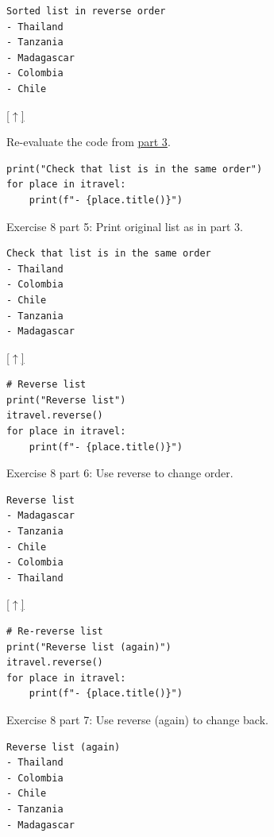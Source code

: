\documentclass[10pt]{book}
\newenvironment{code}{\captionsetup{labelfont=bf, type=listing, name=Snippet, aboveskip=-3pt ,belowskip=15pt}}{}
\begin{document}
\begin{enumerate}
\label{org53c1b01}
\begin{verbatim}
Sorted list in reverse order
- Thailand
- Tanzania
- Madagascar
- Colombia
- Chile
\end{verbatim}

\hyperref[sec:orge5f6a28]{{[}\(\uparrow\)]​}

\label{org7a12a4d}
Re-evaluate the code from \hyperref[orgd47260f]{part 3}.
\begin{code}
\begin{verbatim}
print("Check that list is in the same order")
for place in itravel:
    print(f"- {place.title()}")
\end{verbatim}
\caption{Exercise 8 part 5: Print original list as in part 3.}
\end{code}

\label{org73e1772}
\begin{verbatim}
Check that list is in the same order
- Thailand
- Colombia
- Chile
- Tanzania
- Madagascar
\end{verbatim}

\hyperref[sec:orge5f6a28]{{[}\(\uparrow\)]​}

\label{org76bd2f9}
\begin{code}
\begin{verbatim}
# Reverse list
print("Reverse list")
itravel.reverse()
for place in itravel:
    print(f"- {place.title()}")
\end{verbatim}
\caption{\label{lst:org9233702}Exercise 8 part 6: Use reverse to change order.}
\end{code}

\label{orgc58c421}
\begin{verbatim}
Reverse list
- Madagascar
- Tanzania
- Chile
- Colombia
- Thailand
\end{verbatim}

\hyperref[sec:orge5f6a28]{{[}\(\uparrow\)]​}

\label{org7dae843}
\begin{code}
\begin{verbatim}
# Re-reverse list
print("Reverse list (again)")
itravel.reverse()
for place in itravel:
    print(f"- {place.title()}")
\end{verbatim}
\caption{\label{lst:orgad6e1f4}Exercise 8 part 7: Use reverse (again) to change back.}
\end{code}

\label{org9028f7f}
\begin{verbatim}
Reverse list (again)
- Thailand
- Colombia
- Chile
- Tanzania
- Madagascar
\end{verbatim}


\end{enumerate}
\end{document}
